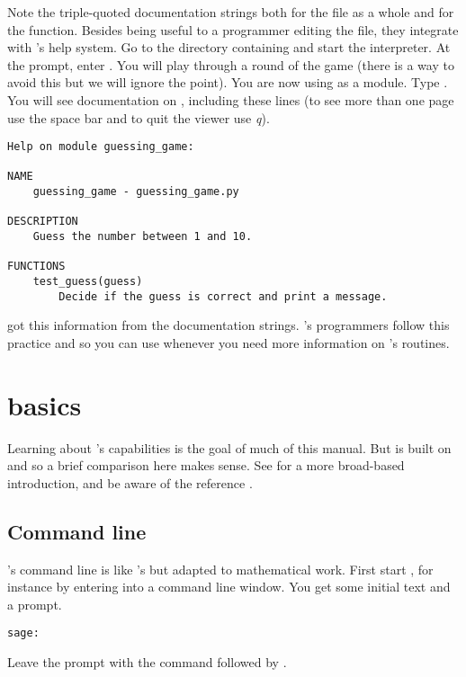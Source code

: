 Note the triple-quoted documentation strings both for the 
file as a whole and for the function.
Besides being useful to a programmer editing the file, 
they integrate with \python's help system. 
Go to the directory containing  and start 
the \python{} interpreter.
At the \inlinecode{>>>} prompt, enter .
You will play through a round of the game (there is a way to avoid this
but we will ignore the point).
You are now using  as a module.
Type
.
You will see documentation on , 
including these lines
(to see more than one page use the space bar and to quit the viewer use \textit{q}).
\begin{lstlisting}
Help on module guessing_game:

NAME
    guessing_game - guessing_game.py

DESCRIPTION
    Guess the number between 1 and 10.

FUNCTIONS
    test_guess(guess)
        Decide if the guess is correct and print a message.
\end{lstlisting}
\python{} got this information from the documentation strings.
\Sage's programmers follow this practice and so 
you can use  
whenever you need more information on \Sage's routines.





\section{\Sage{} basics}
Learning about \Sage's capabilities is the goal of much of this manual.
But \Sage{} is built on \python{} and so a brief comparison here makes sense.
See \citep{SageTeam19} for a more broad-based introduction, and 
be aware of the reference \citep{SageTeam19ref}.



\subsection{Command line}
\Sage's command line is like \python's but adapted to 
mathematical work.
First start \Sage,
for instance by entering  into a command line window.
You get some initial text and a prompt.
\begin{lstlisting}[style=python]
sage:  
\end{lstlisting}
Leave the prompt with the command 
followed by .

